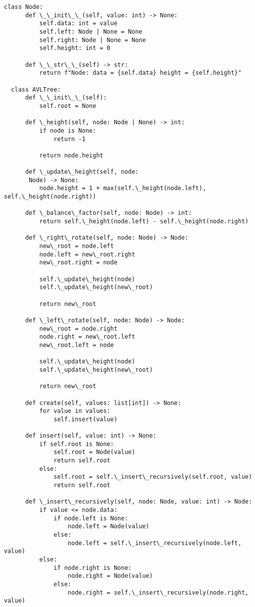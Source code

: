\documentclass{jlreq}
\begin{document}
  \begin{lstlisting}[caption=二分ヒープの実装, label=binaryheap, frame=TRBL, label={binaryheap}]
  class Node:
      def \_\_init\_\_(self, value: int) -> None:
          self.data: int = value
          self.left: Node | None = None
          self.right: Node | None = None
          self.height: int = 0
      
      def \_\_str\_\_(self) -> str:
          return f"Node: data = {self.data} height = {self.height}"
          
  class AVLTree:
      def \_\_init\_\_(self):
          self.root = None
      
      def \_height(self, node: Node | None) -> int:
          if node is None:
              return -1
          
          return node.height
          
      def \_update\_height(self, node:
       Node) -> None:
          node.height = 1 + max(self.\_height(node.left), self.\_height(node.right))
  
      def \_balance\_factor(self, node: Node) -> int:
          return self.\_height(node.left) - self.\_height(node.right)
  
      def \_right\_rotate(self, node: Node) -> Node:
          new\_root = node.left
          node.left = new\_root.right
          new\_root.right = node
          
          self.\_update\_height(node)
          self.\_update\_height(new\_root)
          
          return new\_root 
      
      def \_left\_rotate(self, node: Node) -> Node:
          new\_root = node.right
          node.right = new\_root.left
          new\_root.left = node
          
          self.\_update\_height(node)
          self.\_update\_height(new\_root)
          
          return new\_root
          
      def create(self, values: list[int]) -> None:
          for value in values:
              self.insert(value)
      
      def insert(self, value: int) -> None:
          if self.root is None:
              self.root = Node(value)
              return self.root
          else:
              self.root = self.\_insert\_recursively(self.root, value)
              return self.root
      
      def \_insert\_recursively(self, node: Node, value: int) -> Node:
          if value <= node.data:
              if node.left is None:
                  node.left = Node(value)
              else:
                  node.left = self.\_insert\_recursively(node.left, value)
          else:
              if node.right is None:
                  node.right = Node(value)
              else:
                  node.right = self.\_insert\_recursively(node.right, value)
          

\end{lstlisting}
\end{document}
